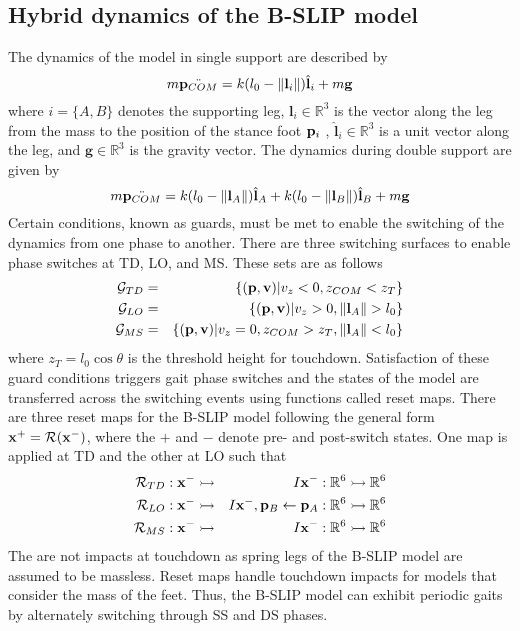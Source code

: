 \subsection{Hybrid dynamics of the B-SLIP model}
The dynamics of the model in single support are described by
\begin{equation}
	m\ddot{\mathbf{p}_{COM}} = k(l_0 - \lVert \mathbf{l}_i \rVert)\hat{\mathbf{l}}_i + m \mathbf{g}
\end{equation}
\noindent where $ i = \{A,B\} $ denotes the supporting leg, $ \mathbf{l}_i \in \mathbb{R}^3 $ is the vector along the leg from the mass to the position of the stance foot $\mathbf{p}_i$ , $ \hat{\mathbf{l}}_i \in \mathbb{R}^3$ is a unit vector along the leg, and $ \mathbf{g} \in \mathbb{R}^3 $ is the gravity vector. The dynamics during double support are given by
\begin{equation}
	m\ddot{\mathbf{p}_{COM}} = k(l_0 - \lVert \mathbf{l}_A \rVert)\hat{\mathbf{l}}_A + k(l_0 - \lVert \mathbf{l}_B \rVert)\hat{\mathbf{l}}_B + m \mathbf{g}
\end{equation}
%
\noindent Certain conditions, known as guards, must be met to enable the switching of the dynamics from one phase to another. There are three switching surfaces to enable phase switches at TD, LO, and MS. These sets are as follows
%
\begin{eqnarray}
	\mathcal{G}_{TD} &=& \{(\mathbf{p},\mathbf{v})| v_z < 0 ,z_{COM} < z_{T}\} \\
	\mathcal{G}_{LO} &=& \{(\mathbf{p},\mathbf{v})| v_z > 0 ,\lVert \mathbf{l}_A \rVert > l_0\} \\
	\mathcal{G}_{MS} &=& \{(\mathbf{p},\mathbf{v})| v_z = 0 ,z_{COM} > z_{T} ,\lVert \mathbf{l}_A \rVert < l_0\} 
\end{eqnarray} 
%
\noindent where $ z_{T} = l_0 \cos \theta $ is the threshold height for touchdown. Satisfaction of these guard conditions triggers gait phase switches and the states of the model are transferred across the switching events using functions called reset maps. There are three reset maps for the B-SLIP model following the general form $ \mathbf{x}^+ = \mathcal{R(\mathbf{x}^-)} $, where the $ + $ and $ - $ denote pre- and post-switch states. One map is applied at TD and the other at LO such that
%
\begin{eqnarray}
	\mathcal{R}_{TD}:\mathbf{x}^- &\rightarrowtail& I\mathbf{x}^- :\mathbb{R}^6 \rightarrowtail \mathbb{R}^6 \\
	\mathcal{R}_{LO}:\mathbf{x}^- &\rightarrowtail& I\mathbf{x}^- ,\mathbf{p}_B \leftarrow \mathbf{p}_A :\mathbb{R}^6 \rightarrowtail \mathbb{R}^6 \\
	\mathcal{R}_{MS}:\mathbf{x}^- &\rightarrowtail& I\mathbf{x}^- :\mathbb{R}^6 \rightarrowtail \mathbb{R}^6
\end{eqnarray}
%
The are not impacts at touchdown as spring legs of the B-SLIP model are assumed to be massless. Reset maps handle touchdown impacts for models that consider the mass of the feet. Thus, the B-SLIP model can exhibit periodic gaits by alternately switching through SS and DS phases.

